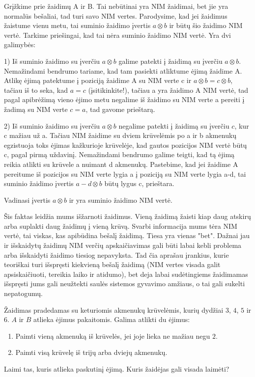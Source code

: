 Grįžkime prie žaidimų A ir B. Tai nebūtinai yra NIM žaidimai, bet jie yra
normalūs bešaliai, tad turi savo NIM vertes. Parodysime, kad jei žaidimus
žaistume vienu metu, tai suminio žaidimo įvertis  $a\otimes b$ ir būtų šio
žaidimo NIM vertė. Tarkime priešingai, kad tai nėra suminio žaidimo NIM vertė.
Yra dvi galimybės:

1) Iš suminio žaidimo su įverčiu $a\otimes b$ galime patekti į žaidimą su
įverčiu $a\otimes b$. Nemažindami bendrumo tariame, kad tam pasiekti atliktume
ėjimą žaidime A. Atlikę ėjimą patektume į poziciją žaidime A su NIM verte c ir
$a\otimes b = c\otimes b$, tačiau iš to seka, kad $a=c$ (įsitikinkite!), tačiau
a yra žaidimo A NIM vertė, tad pagal apibrėžimą vieno ėjimo metu negalime iš
žaidimo su NIM verte a pereiti į žadimą su NIM verte $c=a$, tad gavome
prieštarą.

2) Iš suminio žaidimo su įverčiu $a\otimes b$ negalime patekti į žaidimą su
įverčiu $c$, kur c mažiau už a. Tačiau NIM žaidime su dviem krūvelėmis po a ir
b akmenukų egzistuoja toks ėjimas kažkurioje krūvelėje, kad gautos pozicijos
NIM vertė būtų c, pagal pirmą uždavinį. Nemažindami bendrumo galime teigti, kad
tą ėjimą reikia atlikti su krūvele a nuimant d akmenukų. Pastebime, kad jei
žaidime A pereitume iš pozicijos su NIM verte lygia a į poziciją su NIM verte
lygia a-d, tai suminio žaidimo įvertis  $a-d\otimes b$ būtų lygus c, prieštara.

Vadinasi įvertis $a\otimes b$ ir yra suminio žaidimo NIM vertė.

Šis faktas leidžia mums išžarnoti žaidimus. Vieną žaidimą žaisti kiap daug
atskirų arba suplakti daug žaidimų į vieną krūvą. Svarbi informacija mums tėra
NIM vertė, tai viskas, kas apibūdina bešalį žaidimą. Tiesa yra vienas "bet".
Dažnai jau ir išskaidytų žaidimų NIM verčių apskaičiavimas gali būti labai
kebli problema arba išskaidyti žaidimo tiesiog nepavyksta. Tad čia aprašau
įrankius, kurie teoriškai turi išspręsti kiekvieną bešalį žaidimą (NIM vertes
visada galit apsiskaičiuoti, tereikia laiko ir atidumo), bet deja labai
sudėtingiems žaidimamas išspręsti jums gali neužtekti saulės sistemos gyvavimo
amžiaus, o tai gali sukelti nepatogumų.

\begin{pavnr}
  Žaidimas pradedamas su keturiomis akmenukų krūvelėmis, kurių dydžiai $3$,
  $4$, $5$ ir $6$. $A$ ir $B$ atlieka ėjimus pakaitomis. Galima atlikti du
  ėjimus:
  \begin{enumerate}
    \item Paimti vieną akmenuką iš krūvelės, jei joje lieka ne mažiau negu $2$.
    \item Paimti visą krūvelę iš trijų arba dviejų akmenukų.
  \end{enumerate}
  Laimi tas, kuris atlieka paskutinį ėjimą. Kuris žaidėjas gali visada laimėti?
\end{pavnr}

